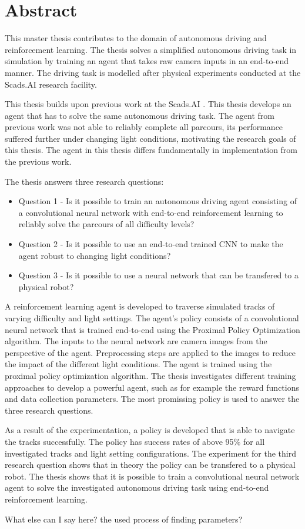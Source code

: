 \section*{Abstract}
\label{sec:Abstract}

This master thesis contributes to the domain of autonomous driving and reinforcement learning. The thesis solves a simplified autonomous driving task in simulation by training an agent that takes raw camera inputs in an end-to-end manner. The driving task is modelled after physical experiments conducted at the Scads.AI research facility.

This thesis builds upon previous work at the Scads.AI \autocite{maximilian}. This thesis develops an agent that has to solve the same autonomous driving task. The agent from previous work was not able to reliably complete all parcours, its performance suffered further under changing light conditions, motivating the research goals of this thesis. The agent in this thesis differs fundamentally in implementation from the previous work.

The thesis answers three research questions:
\begin{itemize}
    \item Question 1 - Is it possible to train an autonomous driving agent consisting of a convolutional neural network with end-to-end reinforcement learning to reliably solve the parcours of all difficulty levels?
    \item Question 2 - Is it possible to use an end-to-end trained CNN to make the agent robust to changing light conditions?
    \item Question 3 - Is it possible to use a neural network that can be transfered to a physical robot?
\end{itemize}
A reinforcement learning agent is developed to traverse simulated tracks of varying difficulty and light settings. The agent's policy consists of a convolutional neural network that is trained end-to-end using the Proximal Policy Optimization algorithm. The inputs to the neural network are camera images from the perspective of the agent. Preprocessing steps are applied to the images to reduce the impact of the different light conditions. The agent is trained using the proximal policy optimization algorithm.
The thesis investigates different training approaches to develop a powerful agent, such as for example the reward functions and data collection parameters. The most promissing policy is used to answer the three research questions.

As a result of the experimentation, a policy is developed that is able to navigate the tracks successfully. The policy has success rates of above 95\% for all investigated tracks and light setting configurations. The experiment for the third research question shows that in theory the policy can be transfered to a physical robot.
The thesis shows that it is possible to train a convolutional neural network agent to solve the investigated autonomous driving task using end-to-end reinforcement learning.


What else can I say here?
the used process of finding parameters?

